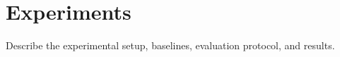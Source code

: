\section{Experiments}
\label{sec:experiments}

Describe the experimental setup, baselines, evaluation protocol, and results.
